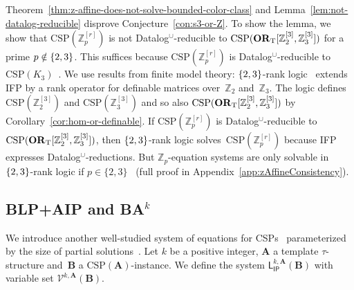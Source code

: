 \documentclass[a4paper,english, thm-restate]{lipics-v2021}
\newcommand{\ZZ}{\mathbb{Z}}
\DeclarePairedDelimiter\set{\lbrace}{\rbrace}
\newcommand{\sig}{\tau}
\newcommand{\StructA}{\mathbf{A}}
\newcommand{\StructB}{\mathbf{B}}
\newcommand{\CSP}[1]{\mathrm{CSP}(#1)}
\newcommand{\leqs}{\mathsf{L}}
\newcommand{\ipk}[3]{\leqs^{#1,#2}_{\mathsf{IP}} (#3)}
\newcommand{\CosetGrpTmplt}[2]{#1^{[#2]}}
\begin{document}
	\noindent
	Theorem~\ref{thm:z-affine-does-not-solve-bounded-color-class}
	and Lemma~\ref{lem:not-datalog-reducible}
	disprove Conjecture~\ref{con:s3-or-Z}.
	To show the lemma, we show that $\CSP{\CosetGrpTmplt{\ZZ_p}{r}}$ is not Datalog$^\cup$-reducible to $\CSP{\ZtwoOrThreeInst}$ for a prime $p \notin\set{2,3}$.
	This suffices because $\CSP{\CosetGrpTmplt{\ZZ_p}{r}}$ is Datalog$^\cup$-reducible to $\CSP{K_3}$~\cite{DalmauOprsal2024}.
	We use results from finite model theory:
	$\set{2,3}$-rank logic~\cite{DawarGHL09}
	extends IFP by a rank operator for definable matrices over~$\ZZ_2$ and~$\ZZ_3$.
	The logic defines $\CSP{\CosetGrpTmplt{\ZZ_2}{3}}$ and $\CSP{\CosetGrpTmplt{\ZZ_3}{3}}$
	and so also $\CSP{\ZtwoOrThreeInst}$ by Corollary~\ref{cor:hom-or-definable}.
	If $\CSP{\CosetGrpTmplt{\ZZ_p}{r}}$ is Datalog$^\cup$-reducible to 
	$\CSP{\ZtwoOrThreeInst}$,  
	then $\set{2,3}$-rank logic solves~$\CSP{\CosetGrpTmplt{\ZZ_p}{r}}$ because IFP expresses Datalog$^\cup$-reductions. But $\ZZ_p$-equation systems are only solvable in $\set{2,3}$-rank logic if $p \in \{2,3\}$~\cite{GradelPakusa19} (full proof in Appendix~\ref{app:zAffineConsistency}).
	
	
	
	
	\newcommand{\BLPAIP}[1]{\mathsf{BLP{+}AIP}(#1)}
	\newcommand{\BAk}[2]{\mathsf{BA}^{#1}(#2)}
	\newcommand{\VarsIP}[3]{\mathcal{V}^{#1,#2}(#3)}
	\subsection{BLP+AIP and BA\texorpdfstring{$^k$}{k}}
	\label{sec:BLP}
	We introduce another well-studied system of equations for CSPs~\cite{BartoBKO2021,BrakensiekGWZ2020} parameterized by the size of partial solutions~\cite{CiardoZivny2023GraphColoring}.
	Let $k$ be a positive integer, $\StructA$ a template $\sig$-structure
	and~$\StructB$ a $\CSP{\StructA}$-instance.
	We define the system
	$\ipk{k}{\StructA}{\StructB}$ with variable set $\VarsIP{k}{\StructA}{\StructB}$.
	
\end{document}
